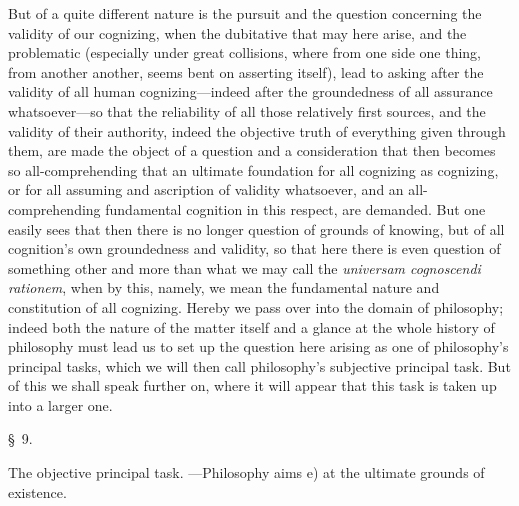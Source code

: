 \documentclass[12pt,a4paper]{book}
\begin{document}
But of a quite different nature is the pursuit and the question concerning the
validity of our cognizing, when the dubitative that may here arise, and the
problematic (especially under great collisions, where from one side one thing,
from another another, seems bent on asserting itself), lead to asking after the
validity of all human cognizing---indeed after the groundedness of all assurance
whatsoever---so that the reliability of all those relatively first sources, and
the validity of their authority, indeed the objective truth of everything given
through them, are made the object of a question and a consideration that then
becomes so all-comprehending that an ultimate foundation for all cognizing as
cognizing, or for all assuming and ascription of validity whatsoever, and an
all-comprehending fundamental cognition in this respect, are demanded. But one
easily sees that then there is no longer question of grounds of knowing, but of
all cognition's own groundedness and validity, so that here there is even question
of something other and more than what we may call the \textit{universam
cognoscendi rationem}, when by this, namely, we mean the fundamental nature and
constitution of all cognizing. Hereby we pass over into the domain of philosophy;
indeed both the nature of the matter itself and a glance at the whole history of
philosophy must lead us to set up the question here arising as one of philosophy's
principal tasks, which we will then call philosophy's subjective principal task.
But of this we shall speak further on, where it will appear that this task is
taken up into a larger one.

\begin{center}\large\S~9.\end{center}
\begin{center}The objective principal task. ---Philosophy aims e) at the ultimate
grounds of existence.\end{center}
\end{document}
